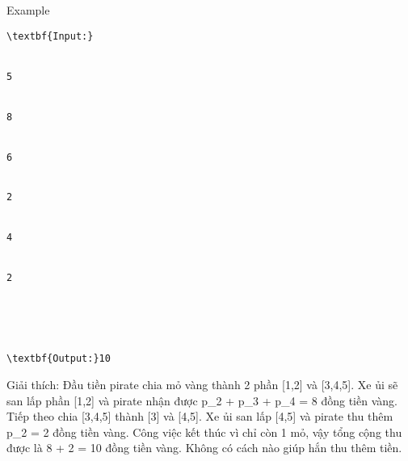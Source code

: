 Example
\begin{verbatim}
\textbf{Input:}


5


8


6


2


4


2





\textbf{Output:}10
\end{verbatim}

   Giải thích: Đầu tiền pirate chia mỏ vàng thành 2 phần [1,2] và [3,4,5]. Xe ủi sẽ san lấp phần [1,2] và pirate nhận được p\_2 + p\_3 + p\_4 =  8 đồng tiền vàng. Tiếp theo chia [3,4,5] thành [3] và [4,5]. Xe ủi san lấp [4,5] và pirate thu thêm p\_2 = 2 đồng tiền vàng. Công việc kết thúc vì chỉ còn 1 mỏ, vậy tổng cộng thu được là 8 + 2 = 10 đồng tiền vàng. Không có cách nào giúp hắn thu thêm tiền.